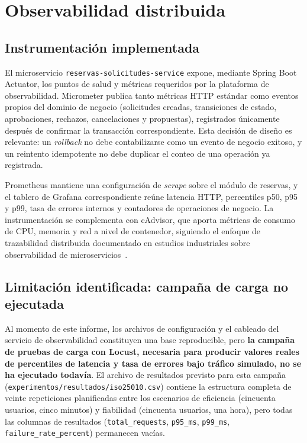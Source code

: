 \documentclass[11pt,a4paper]{article}
\begin{document}
\section{Observabilidad distribuida}
\label{sec:observabilidad}

\subsection{Instrumentación implementada}

El microservicio \texttt{reservas-solicitudes-service} expone, mediante
Spring Boot Actuator, los puntos de salud y métricas requeridos por la
plataforma de observabilidad. Micrometer publica tanto métricas HTTP
estándar como eventos propios del dominio de negocio (solicitudes
creadas, transiciones de estado, aprobaciones, rechazos, cancelaciones y
propuestas), registrados únicamente después de confirmar la transacción
correspondiente. Esta decisión de diseño es relevante: un
\emph{rollback} no debe contabilizarse como un evento de negocio
exitoso, y un reintento idempotente no debe duplicar el conteo de una
operación ya registrada.

Prometheus mantiene una configuración de \emph{scrape} sobre el módulo
de reservas, y el tablero de Grafana correspondiente reúne latencia
HTTP, percentiles p50, p95 y p99, tasa de errores internos y contadores
de operaciones de negocio. La instrumentación se complementa con
cAdvisor, que aporta métricas de consumo de CPU, memoria y red a nivel
de contenedor, siguiendo el enfoque de trazabilidad distribuida
documentado en estudios industriales sobre observabilidad de
microservicios~\cite{li2022enjoy}.

\subsection{Limitación identificada: campaña de carga no ejecutada}

Al momento de este informe, los archivos de configuración y el cableado
del servicio de observabilidad constituyen una base reproducible, pero
\textbf{la campaña de pruebas de carga con Locust, necesaria para
producir valores reales de percentiles de latencia y tasa de errores
bajo tráfico simulado, no se ha ejecutado todavía}. El archivo de
resultados previsto para esta campaña
(\texttt{experimentos/resultados/iso25010.csv}) contiene la estructura
completa de veinte repeticiones planificadas entre los escenarios de
eficiencia (cincuenta usuarios, cinco minutos) y fiabilidad (cincuenta
usuarios, una hora), pero todas las columnas de resultados
(\texttt{total\_requests}, \texttt{p95\_ms}, \texttt{p99\_ms},
\texttt{failure\_rate\_percent}) permanecen vacías.
\end{document}
